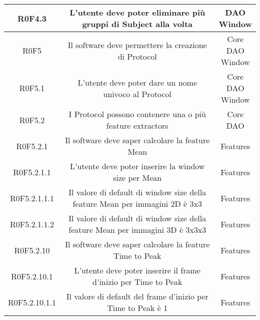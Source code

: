 \begin{center}
\begin{longtable}{|c|c|c|}
\hline
R0F4.3   & \parbox[t]{\larghezza}{L'utente deve poter eliminare più gruppi di Subject alla volta}  & \parbox[t]{\dimFonti}{ DAO \\ Window \\} \\
\hline
R0F5   & \parbox[t]{\larghezza}{Il software deve permettere la creazione di Protocol}  & \parbox[t]{\dimFonti}{ Core \\ DAO \\ Window \\} \\
\hline
R0F5.1   & \parbox[t]{\larghezza}{L'utente deve poter dare un nome univoco al Protocol}  & \parbox[t]{\dimFonti}{ Core \\ DAO \\ Window \\} \\
\hline
R0F5.2   & \parbox[t]{\larghezza}{I Protocol possono contenere una o più feature extractors}  & \parbox[t]{\dimFonti}{ Core \\ DAO \\} \\
\hline
R0F5.2.1   & \parbox[t]{\larghezza}{Il software deve saper calcolare la feature Mean}  & \parbox[t]{\dimFonti}{ Features \\} \\
\hline
R0F5.2.1.1   & \parbox[t]{\larghezza}{L'utente deve poter inserire la window size per Mean}  & \parbox[t]{\dimFonti}{ Features \\} \\
\hline
R0F5.2.1.1.1   & \parbox[t]{\larghezza}{Il valore di default di window size della feature Mean per immagini 2D è 3x3 }  & \parbox[t]{\dimFonti}{ Features \\} \\
\hline
R0F5.2.1.1.2   & \parbox[t]{\larghezza}{Il valore di default di window size della feature Mean per immagini 3D è 3x3x3}  & \parbox[t]{\dimFonti}{ Features \\} \\
\hline
R0F5.2.10   & \parbox[t]{\larghezza}{Il software deve saper calcolare la feature\glossario{} Time to Peak}  & \parbox[t]{\dimFonti}{ Features \\} \\
\hline
R0F5.2.10.1   & \parbox[t]{\larghezza}{L'utente deve poter inserire il frame d'inizio per Time to Peak}  & \parbox[t]{\dimFonti}{ Features \\} \\
\hline
R0F5.2.10.1.1   & \parbox[t]{\larghezza}{Il valore di default del frame d'inizio per Time to Peak è 1}  & \parbox[t]{\dimFonti}{ Features \\} \\

\end{longtable}
\end{center}
